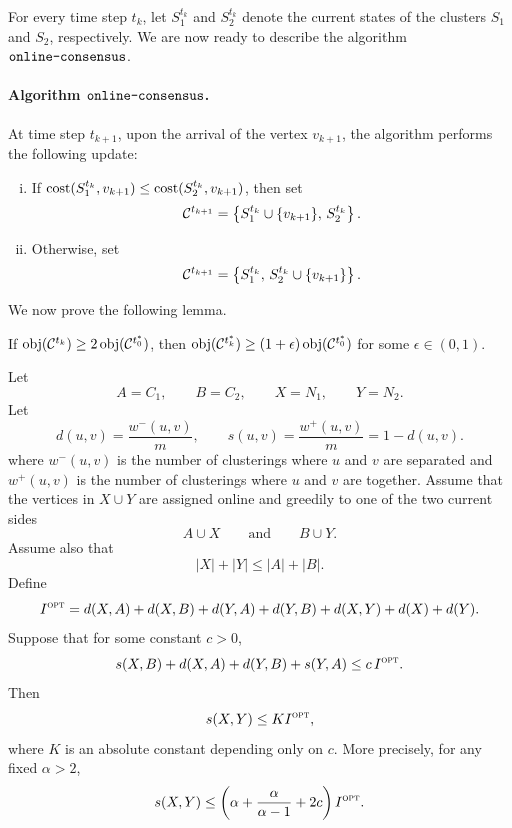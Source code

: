 For every time step $t_k$, let $S_1^{t_k}$ and $S_2^{t_k}$ denote the current states of the clusters $S_1$ and $S_2$, respectively. We are now ready to describe the algorithm $\texttt{online-consensus}$.

\paragraph{Algorithm $\texttt{online-consensus}$.}
At time step $t_{k+1}$, upon the arrival of the vertex $v_{k+1}$, the algorithm performs the following update:
\begin{enumerate}[(i)]
    \item If $\text{cost}(S_1^{t_k},v_{k+1}) \le \text{cost}(S_2^{t_k},v_{k+1})$, then set
    \[
        \mathcal{C}^{t_{k+1}}
        =
        \left\{
        S_1^{t_k} \cup \{v_{k+1}\},
        \,
        S_2^{t_k}
        \right\}.
    \]

    \item Otherwise, set
    \[
        \mathcal{C}^{t_{k+1}}
        =
        \left\{
        S_1^{t_k},
        \,
        S_2^{t_k} \cup \{v_{k+1}\}
        \right\}.
    \]
\end{enumerate}

We now prove the following lemma.

\begin{lemma}\label{lem:toy.example.merge.case}
If $\obj(\solcls{k}) \ge 2\,\obj(\optcls{0})$, then $\obj(\optcls{k}) \ge (1+\epsilon)\,\obj(\optcls{0})$ for some $\epsilon \in (0,1)$.
\end{lemma}

\begin{lemma}\label{lem:charging.s.N1.N2}
Let
\[
    A=C_1,\qquad B=C_2,\qquad X=N_1,\qquad Y=N_2.
\]
Let
\[
    d(u,v)=\frac{w^-(u,v)}{m},
    \qquad
    s(u,v)=\frac{w^+(u,v)}{m}=1-d(u,v).
\]
where $w^-(u,v)$ is the number of clusterings where $u$ and $v$ are separated and $w^+(u,v)$ is the number of clusterings where $u$ and $v$ are together.
Assume that the vertices in $X\cup Y$ are assigned online and greedily to one
of the two current sides
\[
    A\cup X
    \qquad\text{and}\qquad
    B\cup Y.
\]
Assume also that
\[
    |X|+|Y|\le |A|+|B|.
\]
Define
\[
    I^{\textsc{opt}}
    =
    d(X,A)+d(X,B)+d(Y,A)+d(Y,B)+d(X,Y)+d(X)+d(Y).
\]
Suppose that for some constant $c>0$,
\[
    s(X,B)+d(X,A)+d(Y,B)+s(Y,A)
    \le
    c\,I^{\textsc{opt}}.
\]
Then
\[
    s(X,Y)\le K I^{\textsc{opt}},
\]
where $K$ is an absolute constant depending only on $c$. More precisely, for
any fixed $\alpha>2$,
\[
    s(X,Y)
    \le
    \left(
        \alpha+\frac{\alpha}{\alpha-1}+2c
    \right)I^{\textsc{opt}}.
\]
\end{lemma}

